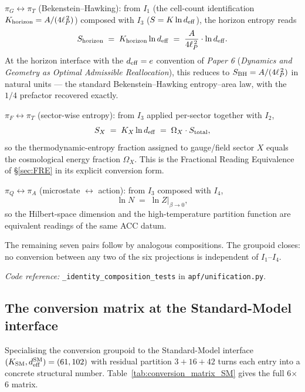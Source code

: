 \documentclass[11pt]{article}
\newcommand{\coderef}[2]{\smallskip\noindent\textit{Code reference:} \texttt{#1} in \texttt{#2}.}
\newcommand{\paperref}[2]{\emph{Paper #1} (\emph{#2})}
\begin{document}
\smallskip
\noindent\textbf{$\pi_G \leftrightarrow \pi_T$} (Bekenstein--Hawking): from $I_1$ (the cell-count identification $K_{\rm horizon} = A/(4\ell_P^{\,2})$) composed with $I_3$ ($S = K \ln d_{\rm eff}$), the horizon entropy reads
\[
S_{\rm horizon} \;=\; K_{\rm horizon} \ln d_{\rm eff} \;=\; \frac{A}{4\ell_P^{\,2}} \cdot \ln d_{\rm eff}.
\]
At the horizon interface with the $d_{\rm eff} = e$ convention of \paperref{6}{Dynamics and Geometry as Optimal Admissible Reallocation}, this reduces to $S_{\rm BH} = A/(4\ell_P^{\,2})$ in natural units --- the standard Bekenstein--Hawking entropy--area law, with the $1/4$ prefactor recovered exactly.

\smallskip
\noindent\textbf{$\pi_F \leftrightarrow \pi_T$} (sector-wise entropy): from $I_3$ applied per-sector together with $I_2$,
\[
S_X \;=\; K_X \ln d_{\rm eff} \;=\; \Omega_X \cdot S_{\rm total},
\]
so the thermodynamic-entropy fraction assigned to gauge/field sector $X$ equals the cosmological energy fraction $\Omega_X$. This is the Fractional Reading Equivalence of \S\ref{sec:FRE} in its explicit conversion form.

\smallskip
\noindent\textbf{$\pi_Q \leftrightarrow \pi_A$} (microstate $\leftrightarrow$ action): from $I_3$ composed with $I_4$,
\[
\ln N \;=\; \ln Z|_{\beta \to 0},
\]
so the Hilbert-space dimension and the high-temperature partition function are equivalent readings of the same ACC datum.

\smallskip

The remaining seven pairs follow by analogous compositions. The groupoid closes: no conversion between any two of the six projections is independent of $I_1$--$I_4$.

\coderef{\_identity\_composition\_tests}{apf/unification.py}

\subsection{The conversion matrix at the Standard-Model interface}\label{sec:conversion_matrix_SM}

Specialising the conversion groupoid to the Standard-Model interface $(K_{\rm SM}, d_{\rm eff}^{\rm SM}) = (61, 102)$ with residual partition $3 + 16 + 42$ turns each entry into a concrete structural number. Table~\ref{tab:conversion_matrix_SM} gives the full 6$\times$6 matrix.
\end{document}
